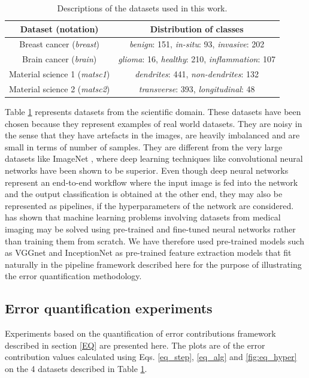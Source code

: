 \begin{table}[ht!]
\centering
\caption{Descriptions of the datasets used in this work.}
\begin{tabular}{ |c|c| } 
 \hline
 Dataset (notation) & Distribution of classes \\ 
 \hline
 Breast cancer (\textit{breast}) \cite{bilgin2007cell} & \textit{benign}: 151, \textit{in-situ}: 93, \textit{invasive}: 202\\
 \hline
 Brain cancer (\textit{brain}) \cite{gunduz2004cell} & \textit{glioma}: 16, \textit{healthy}: 210, \textit{inflammation}: 107\\
 \hline
  Material science 1 (\textit{matsc1}) \cite{chowdhury2016image} & \textit{dendrites}: 441, \textit{non-dendrites}: 132 \\
 \hline
 Material science 2 (\textit{matsc2}) \cite{chowdhury2016image} & \textit{transverse}: 393, \textit{longitudinal}: 48 \\
 \hline
 \end{tabular}
\label{table:datasets}
\end{table}
Table \ref{table:datasets} represents datasets from the scientific domain. These datasets have been chosen because they represent examples of real world datasets. They are noisy in the sense that they have artefacts in the images, are heavily imbalanced and are small in terms of number of samples. They are different from the very large datasets like ImageNet \cite{deng2009imagenet}, where deep learning techniques like convolutional neural networks have been shown to be superior. Even though deep neural networks represent an end-to-end workflow where the input image is fed into the network and the output classification is obtained at the other end, they may also be represented as pipelines, if the hyperparameters of the network are considered. \cite{shin2016deep} has shown that machine learning problems involving datasets from medical imaging may be solved using pre-trained and fine-tuned neural networks rather than training them from scratch. We have therefore used pre-trained models such as VGGnet \cite{simonyan2014very} and InceptionNet \cite{szegedy2016rethinking} as pre-trained feature extraction models that fit naturally in the pipeline framework described here for the purpose of illustrating the error quantification methodology.

\subsection{Error quantification experiments}
\label{eq_expts}
Experiments based on the quantification of error contributions framework described in section \ref{EQ} are presented here. The plots are of the error contribution values calculated using Eqs. \ref{eq_step}, \ref{eq_alg} and \ref{fig:eq_hyper} on the 4 datasets described in Table \ref{table:datasets}. 
